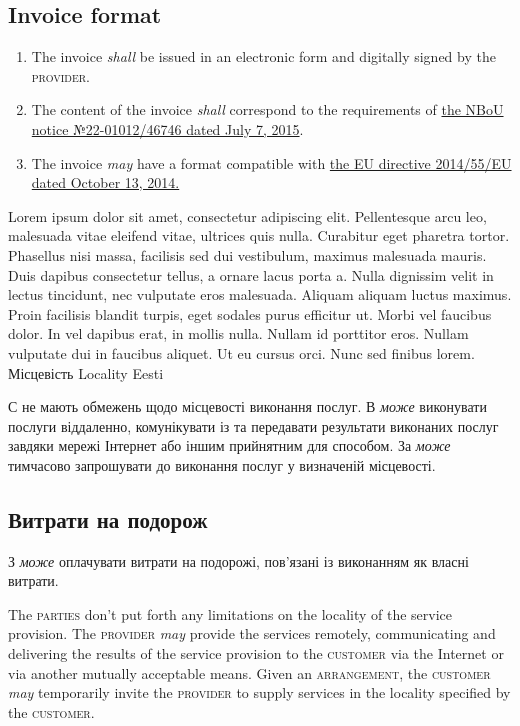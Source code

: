 \begin{Form}
\begin{paracol}{3}
{        \subsection{Invoice format}
        \begin{enumerate}
          \item The invoice \textit{shall} be issued in an electronic form and digitally signed by the \textsc{provider}.
          \item The content of the invoice \textit{shall} correspond to the requirements of \href{http://bank.gov.ua/doccatalog/document?id=19208488}{the NBoU notice №22-01012/46746 dated July 7, 2015}.
          \item The invoice \textit{may} have a format compatible with \href{http://eur-lex.europa.eu/legal-content/EN/TXT/?uri=CELEX:32014L0055}{the EU directive 2014/55/EU dated October 13, 2014.}
        \end{enumerate}
        }
        {Lorem ipsum dolor sit amet, consectetur adipiscing elit. Pellentesque arcu leo, malesuada vitae eleifend vitae, ultrices quis nulla. Curabitur eget pharetra tortor. Phasellus nisi massa, facilisis sed dui vestibulum, maximus malesuada mauris. Duis dapibus consectetur tellus, a ornare lacus porta a. Nulla dignissim velit in lectus tincidunt, nec vulputate eros malesuada. Aliquam aliquam luctus maximus. Proin facilisis blandit turpis, eget sodales purus efficitur ut. Morbi vel faucibus dolor. In vel dapibus erat, in mollis nulla. Nullam id porttitor eros. Nullam vulputate dui in faucibus aliquet. Ut eu cursus orci. Nunc sed finibus lorem.}
      \clause
        {Місцевість}
        {Locality}
        {Eesti}
        {С не мають обмежень щодо місцевості виконання послуг. В \textit{може} виконувати послуги віддаленно, комунікувати із  та передавати результати виконаних послуг завдяки мережі Інтернет або іншим прийнятним для  способом. За   \textit{може} тимчасово запрошувати  до виконання послуг у визначеній  місцевості.

        \subsection{Витрати на подорож}
        З \textit{може} оплачувати витрати  на подорожі, пов'язані із виконанням  як власні витрати. %
        }
        {The \textsc{parties} don't put forth any limitations on the locality of the service provision. The \textsc{provider} \textit{may} provide the services remotely, communicating and delivering the results of the service provision to the \textsc{customer} via the Internet or via another mutually acceptable means. Given an \textsc{arrangement}, the \textsc{customer} \textit{may} temporarily invite the \textsc{provider} to supply services in the locality specified by the \textsc{customer}.

}
\end{paracol}
\end{Form}
